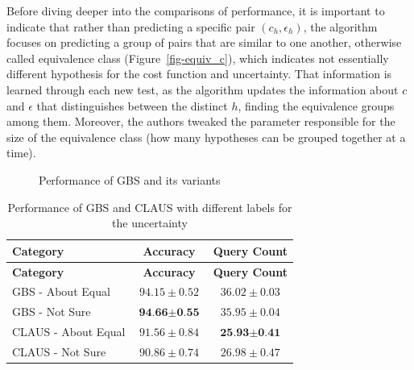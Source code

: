 \documentclass[
  letterpaper,
  numbers=noenddot,
  DIV=11]{scrreprt}
\theoremstyle{definition}
\theoremstyle{plain}
\theoremstyle{plain}
\theoremstyle{remark}
\begin{document}
Before diving deeper into the comparisons of performance, it is
important to indicate that rather than predicting a specific pair
\((c_h, \epsilon_h)\), the algorithm focuses on predicting a group of
pairs that are similar to one another, otherwise called equivalence
class (Figure~\ref{fig-equiv_c}), which indicates not essentially
different hypothesis for the cost function and uncertainty. That
information is learned through each new test, as the algorithm updates
the information about \(c\) and \(\epsilon\) that distinguishes between
the distinct \(h\), finding the equivalence groups among them. Moreover,
the authors tweaked the parameter responsible for the size of the
equivalence class (how many hypotheses can be grouped together at a
time).

\begin{figure}


\caption{\label{fig-claus_num}Performance of GBS and its variants}

\end{figure}%

\begin{longtable}[]{@{}lcc@{}}
\caption{Performance of GBS and CLAUS with different labels for the
uncertainty}\label{tbl-claus_tab}\tabularnewline
\toprule\noalign{}
\textbf{Category} & \textbf{Accuracy} & \textbf{Query Count} \\
\midrule\noalign{}
\endfirsthead
\toprule\noalign{}
\textbf{Category} & \textbf{Accuracy} & \textbf{Query Count} \\
\midrule\noalign{}
\endhead
\bottomrule\noalign{}
\endlastfoot
GBS - About Equal & \(94.15 \pm 0.52\) & \(36.02 \pm 0.03\) \\
GBS - Not Sure & \(\textbf{94.66} \pm \textbf{0.55}\) &
\(35.95 \pm 0.04\) \\
CLAUS - About Equal & \(91.56 \pm 0.84\) &
\(\textbf{25.93} \pm \textbf{0.41}\) \\
CLAUS - Not Sure & \(90.86 \pm 0.74\) & \(26.98 \pm 0.47\) \\
\end{longtable}
\end{document}
